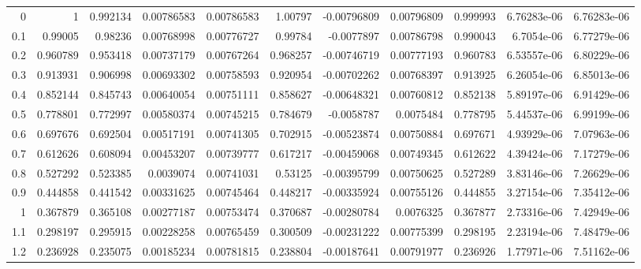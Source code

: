 {\begin{tabular}{rrrrrrrrrrr}
  0 & 1          & 0.992134   &   0.00786583  &    0.00786583 & 1.00797    &  -0.00796809  &    0.00796809 & 0.999993   &   6.76283e-06 &   6.76283e-06 \\
  0.1         & 0.99005    & 0.98236    &   0.00768998  &    0.00776727 & 0.99784    &  -0.0077897   &    0.00786798 & 0.990043   &   6.7054e-06  &   6.77279e-06 \\
  0.2         & 0.960789   & 0.953418   &   0.00737179  &    0.00767264 & 0.968257   &  -0.00746719  &    0.00777193 & 0.960783   &   6.53557e-06 &   6.80229e-06 \\
  0.3         & 0.913931   & 0.906998   &   0.00693302  &    0.00758593 & 0.920954   &  -0.00702262  &    0.00768397 & 0.913925   &   6.26054e-06 &   6.85013e-06 \\
  0.4         & 0.852144   & 0.845743   &   0.00640054  &    0.00751111 & 0.858627   &  -0.00648321  &    0.00760812 & 0.852138   &   5.89197e-06 &   6.91429e-06 \\
  0.5         & 0.778801   & 0.772997   &   0.00580374  &    0.00745215 & 0.784679   &  -0.0058787   &    0.0075484  & 0.778795   &   5.44537e-06 &   6.99199e-06 \\
  0.6         & 0.697676   & 0.692504   &   0.00517191  &    0.00741305 & 0.702915   &  -0.00523874  &    0.00750884 & 0.697671   &   4.93929e-06 &   7.07963e-06 \\
  0.7         & 0.612626   & 0.608094   &   0.00453207  &    0.00739777 & 0.617217   &  -0.00459068  &    0.00749345 & 0.612622   &   4.39424e-06 &   7.17279e-06 \\
  0.8         & 0.527292   & 0.523385   &   0.0039074   &    0.00741031 & 0.53125    &  -0.00395799  &    0.00750625 & 0.527289   &   3.83146e-06 &   7.26629e-06 \\
  0.9         & 0.444858   & 0.441542   &   0.00331625  &    0.00745464 & 0.448217   &  -0.00335924  &    0.00755126 & 0.444855   &   3.27154e-06 &   7.35412e-06 \\
  1           & 0.367879   & 0.365108   &   0.00277187  &    0.00753474 & 0.370687   &  -0.00280784  &    0.0076325  & 0.367877   &   2.73316e-06 &   7.42949e-06 \\
  1.1         & 0.298197   & 0.295915   &   0.00228258  &    0.00765459 & 0.300509   &  -0.00231222  &    0.00775399 & 0.298195   &   2.23194e-06 &   7.48479e-06 \\
  1.2         & 0.236928   & 0.235075   &   0.00185234  &    0.00781815 & 0.238804   &  -0.00187641  &    0.00791977 & 0.236926   &   1.77971e-06 &   7.51162e-06 \\

\end{tabular}}
